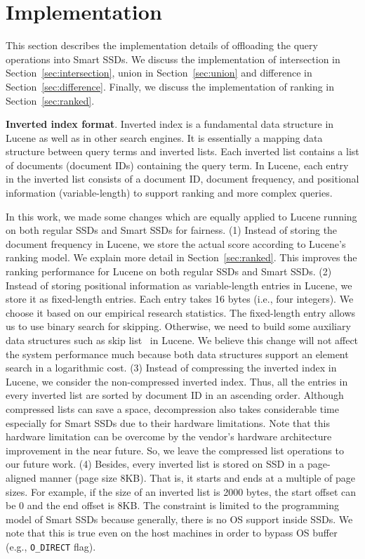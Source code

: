 
\section{Implementation}\label{sec:implementation}
This section describes the implementation details of offloading the query operations into Smart SSDs. We discuss the implementation of intersection in Section~\ref{sec:intersection}, union in Section~\ref{sec:union} and difference in Section~\ref{sec:difference}. Finally, we discuss the implementation of ranking in Section~\ref{sec:ranked}.

\textbf{Inverted index format}. 
Inverted index is a fundamental data structure in Lucene as well as in other search engines.
It is essentially a mapping data structure between query terms and inverted lists.
Each inverted list contains a list of documents (document IDs) containing the query term. 
In Lucene, each entry in the inverted list consists of a document ID, document frequency, and positional information (variable-length) to support ranking and more complex queries.

In this work, we made some changes which are equally applied to Lucene running on both regular SSDs and Smart SSDs for fairness. (1) Instead of storing the document frequency in Lucene, we store the actual score according to Lucene's ranking model. We explain more detail in Section~\ref{sec:ranked}. This improves the ranking performance for Lucene on both regular SSDs and Smart SSDs.
(2) Instead of storing positional information as variable-length entries in Lucene, we store it as fixed-length entries. Each entry takes 16 bytes (i.e., four integers). We choose it based on our empirical research statistics. The fixed-length entry allows us to use binary search for skipping. Otherwise, we need to build some auxiliary data structures such as skip list~\cite{Pugh1990} in Lucene. We believe this change will not affect the system performance much because both data structures support an element search in a logarithmic cost.
(3) Instead of compressing the inverted index in Lucene, we consider the non-compressed inverted index.
Thus, all the entries in every inverted list are sorted by document ID in an ascending order. 
Although compressed lists can save a space, decompression also takes considerable time especially for Smart SSDs due to their hardware limitations. Note that this hardware limitation can be overcome by the vendor's hardware architecture improvement in the near future. So, we leave the compressed list operations to our future work.
(4) Besides, every inverted list is stored on SSD in a page-aligned manner (page size 8KB). That is, it starts and ends at a multiple of page sizes. For example, if the size of an inverted list is 2000 bytes, the start offset can be 0 and the end offset is 8KB. The constraint is limited to the programming model of Smart SSDs because generally, there is no OS support inside SSDs. We note that this is true even on the host machines in order to bypass OS buffer (e.g., \verb"O_DIRECT" flag).


